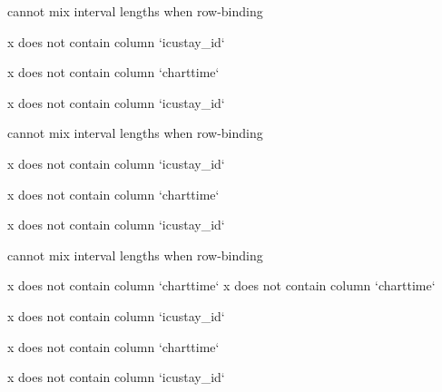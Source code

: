 \documentclass[
]{jss}
\begin{document}
\begin{CodeChunk}
\begin{CodeOutput}
cannot mix interval lengths when row-binding
\end{CodeOutput}

\begin{CodeOutput}
x does not contain column `icustay_id`
\end{CodeOutput}

\begin{CodeOutput}
x does not contain column `charttime`
\end{CodeOutput}

\begin{CodeOutput}
x does not contain column `icustay_id`
\end{CodeOutput}

\begin{CodeOutput}
cannot mix interval lengths when row-binding
\end{CodeOutput}

\begin{CodeOutput}
x does not contain column `icustay_id`
\end{CodeOutput}

\begin{CodeOutput}
x does not contain column `charttime`
\end{CodeOutput}

\begin{CodeOutput}
x does not contain column `icustay_id`
\end{CodeOutput}

\begin{CodeOutput}
cannot mix interval lengths when row-binding
\end{CodeOutput}

\begin{CodeOutput}
x does not contain column `charttime`
x does not contain column `charttime`
\end{CodeOutput}

\begin{CodeOutput}
x does not contain column `icustay_id`
\end{CodeOutput}

\begin{CodeOutput}
x does not contain column `charttime`
\end{CodeOutput}

\begin{CodeOutput}
x does not contain column `icustay_id`
\end{CodeOutput}


\end{CodeChunk}
\end{document}
